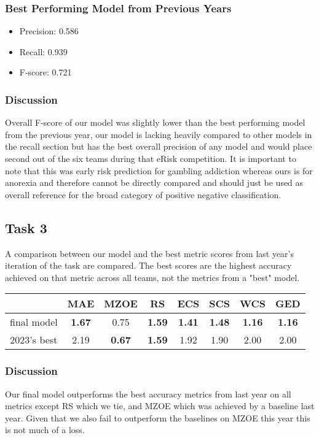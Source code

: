 \documentclass[12pt, titlepage]{article}
\begin{document}
\begin{enumerate}
\subsubsection{Best Performing Model from Previous Years}
\begin{itemize}
   \item Precision: 0.586
   \item Recall: 0.939
   \item F-score: 0.721
\end{itemize}


\subsubsection{Discussion}
Overall F-score of our model was slightly lower than the best performing model from the previous year, our model is lacking heavily compared to other models in the recall section but has the best overall precision of any model and would place second out of the six teams during that eRisk competition. It is important to note that this was early risk prediction for gambling addiction whereas ours is for anorexia and therefore cannot be directly compared and should just be used as overall reference for the broad category of positive negative classification.


\subsection{Task 3}
A comparison between our model and the best metric scores from last year's iteration of the task are compared. The best scores are the highest accuracy achieved on that metric across all teams, not the metrics from a "best" model.


\begin{tabular}{c|ccccccc}
  &  MAE   & MZOE  & RS    & ECS   & SCS   & WCS   & GED \\ \hline
final model  & \textbf{1.67}  & 0.75  & \textbf{1.59}  & \textbf{1.41}  & \textbf{1.48}  & \textbf{1.16} & \textbf{1.16} \\
2023's best  & 2.19  & \textbf{0.67}  & \textbf{1.59}  & 1.92  & 1.90  & 2.00  & 2.00 \\
\end{tabular}


\subsubsection{Discussion}
Our final model outperforms the best accuracy metrics from last year on all metrics except RS which we tie, and MZOE which was achieved by a baseline last year. Given that we also fail to outperform the baselines on MZOE this year this is not much of a loss.





\end{enumerate}
\end{document}
